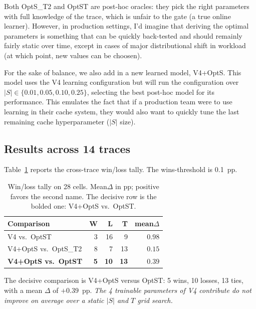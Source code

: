 \documentclass[letterpaper,twocolumn,10pt]{article}
\begin{document}
Both OptS\_T2 and OptST are post-hoc oracles: they pick the right
parameters with full knowledge of the trace, which is unfair to
the gate (a true online learner). However, in production settings, I'd imagine that 
deriving the optimal parameters is something that can be quickly back-tested and should remainly fairly static over time, except in cases of major distributional shift in workload (at which point, new values can be choosen). 

For the sake of balance, we also add in a new learned model, V4+OptS. This model uses the V4 learning configuration but will run the configuration over $|S| \in
  \{0.01, 0.05, 0.10, 0.25\}$, selecting the best post-hoc model for its performance. This emulates the fact that if a production team were to use learning in their cache system, they would also want to quickly tune the last remaining cache hyperparameter ($|S|$ size). 
 
\subsection{Results across 14 traces}
 
Table~\ref{tab:tally} reports the cross-trace win/loss tally. The wins-threshold is 0.1~pp.
 
\begin{table}[t]
\small
\centering
\begin{tabular}{lrrrr}
\toprule
Comparison & W & L & T & mean$\Delta$ \\
\midrule
V4 vs.\ OptST                  & 3  & 16& 9  & $0.98$ \\
V4+OptS vs.\ OptS\_T2 & 8  & 7 & 13 & $0.15$ \\
\textbf{V4+OptS vs.\ OptST}             & \textbf{5}  & \textbf{10} & \textbf{13} & $\mathbf{0.39}$ \\
\bottomrule
\end{tabular}
\caption{Win/loss tally on 28 cells. Mean$\Delta$ in pp; positive
favors the second name. The decisive row is the bolded one:
V4+OptS vs.\ OptST.}
\label{tab:tally}
\end{table}
 
The decisive comparison is V4+OptS versus OptST: 5 wins, 10 losses, 13
ties, with a mean $\Delta$ of $+0.39$~pp. \emph{The 4 trainable
parameters of V4 contribute do not improve on
average over a static $|S|$ and $T$ grid search.}
 
 
\end{document}
